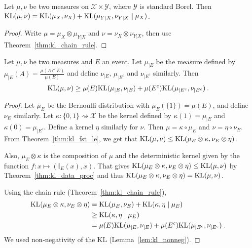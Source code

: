 \begin{theorem}
  \label{thm:kl_chain_rule_prod}
  Let $\mu, \nu$ be two measures on $\mathcal X \times \mathcal Y$, where $\mathcal Y$ is standard Borel.
  Then $\mathrm{KL}(\mu, \nu) = \mathrm{KL}(\mu_X, \nu_X) + \mathrm{KL}(\mu_{Y|X}, \nu_{Y|X} \mid \mu_X)$.
\end{theorem}

\begin{proof}
Write $\mu = \mu_X \otimes \mu_{Y|X}$ and $\nu = \nu_X \otimes \nu_{Y|X}$, then use Theorem~\ref{thm:kl_chain_rule}.
\end{proof}

\begin{lemma}
  \label{thm:kl_chain_rule_cond_event}
  Let $\mu, \nu$ be two measures and $E$ an event. Let $\mu_{|E}$ be the measure defined by $\mu_{|E}(A) = \frac{\mu(A \cap E)}{\mu(E)}$ and define $\nu_{|E}$, $\mu_{| E^c}$ and $\nu_{| E^c}$ similarly. Then
  \begin{align*}
  \mathrm{KL}(\mu, \nu) \ge \mu(E) \mathrm{KL}(\mu_{|E}, \nu_{|E}) + \mu(E^c) \mathrm{KL}(\mu_{|E^c}, \nu_{|E^c}) \: .
  \end{align*}
\end{lemma}

\begin{proof}
Let $\mu_E$ be the Bernoulli distribution with $\mu_E(\{1\}) = \mu(E)$, and define $\nu_E$ similarly.
Let $\kappa : \{0,1\} \rightsquigarrow \mathcal X$ be the kernel defined by $\kappa(1) = \mu_{|E}$ and $\kappa(0) = \mu_{|E^c}$. Define a kernel $\eta$ similarly for $\nu$.
Then $\mu = \kappa \circ \mu_E$ and $\nu = \eta \circ \nu_E$. From Theorem~\ref{thm:kl_fst_le}, we get that $\mathrm{KL}(\mu, \nu) \le \mathrm{KL}(\mu_E \otimes \kappa, \nu_E \otimes \eta)$.

Also, $\mu_E \otimes \kappa$ is the composition of $\mu$ and the deterministic kernel given by the function $f : x \mapsto (\mathbb{I}_E(x), x)$. That gives $\mathrm{KL}(\mu_E \otimes \kappa, \nu_E \otimes \eta) \le \mathrm{KL}(\mu, \nu)$ by Theorem~\ref{thm:kl_data_proc} and thus $\mathrm{KL}(\mu_E \otimes \kappa, \nu_E \otimes \eta) = \mathrm{KL}(\mu, \nu)$.

Using the chain rule (Theorem~\ref{thm:kl_chain_rule}),
\begin{align*}
\mathrm{KL}(\mu_E \otimes \kappa, \nu_E \otimes \eta)
&= \mathrm{KL}(\mu_E, \nu_E) + \mathrm{KL}(\kappa, \eta \mid \mu_E)
\\
&\ge \mathrm{KL}(\kappa, \eta \mid \mu_E)
\\
&= \mu(E) \mathrm{KL}(\mu_{|E}, \nu_{|E}) + \mu(E^c) \mathrm{KL}(\mu_{|E^c}, \nu_{|E^c})
\: .
\end{align*}
We used non-negativity of the KL (Lemma~\ref{lem:kl_nonneg}).

\end{proof}

